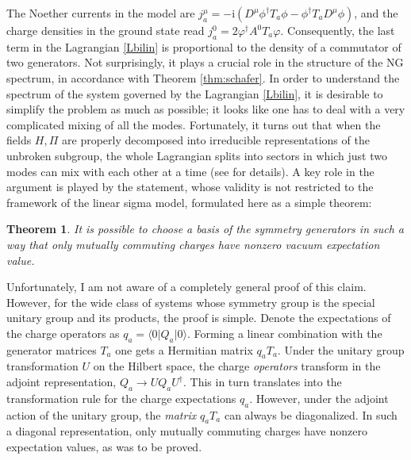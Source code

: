 \documentclass[final,3p,times,12pt,a4paper,sort&compress]{elsarticle}
\newcommand\bra[1]{\langle#1\vert}          %
\newcommand\ket[1]{\vert#1\rangle}          %
\newcommand\he[1]{#1^{\dagger}}             %
\newcommand\imag{\mathrm i}                 %
\newcommand\thname{Theorem}
\newtheorem{theorem}{\thname}
\newcommand\vp{\varphi}
\begin{document}
The Noether currents in the model are $j^\mu_a=-\imag(D^\mu\he\phi T_a\phi-
\he\phi T_aD^\mu\phi)$, and the charge densities in the ground state read
$j^0_a=2\he\vp A^0T_a\vp$. Consequently, the last term in the Lagrangian
\eqref{Lbilin} is proportional to the density of a commutator of two
generators. Not surprisingly, it plays a crucial role in the structure of
the NG spectrum, in accordance with Theorem \ref{thm:schafer}. In order to
understand the spectrum of the system governed by the Lagrangian \eqref{Lbilin},
it is desirable to simplify the problem as much as possible; it looks like one
has to deal with a very complicated mixing of all the modes. Fortunately, it
turns out that when the fields $H,\Pi$ are properly decomposed into irreducible
representations of the unbroken subgroup, the whole Lagrangian splits into
sectors in which just two modes can mix with each other at a time (see
\cite{Brauner:2005di} for details). A key role in the argument is played by the
statement, whose validity is not restricted to the framework of the
linear sigma model, formulated here as a simple theorem:
\begin{theorem}
It is possible to choose a basis of the symmetry generators in such a way that
only mutually commuting charges have nonzero vacuum expectation value.
\end{theorem}
Unfortunately, I am not aware of a completely general proof of this claim.
However, for the wide class of systems whose symmetry group is the special
unitary group and its products, the proof is simple. Denote the expectations of
the charge operators as $q_a=\bra0Q_a\ket0$. Forming a linear combination with
the generator matrices $T_a$ one gets a Hermitian matrix $q_aT_a$. Under the
unitary group transformation $U$ on the Hilbert space, the charge
\emph{operators} transform in the adjoint representation, $Q_a\to UQ_a\he U$.
This in turn translates into the transformation rule for the charge expectations
$q_a$. However, under the adjoint action of the unitary group, the \emph{matrix}
$q_aT_a$ can always be diagonalized. In such a diagonal representation, only
mutually commuting charges have nonzero expectation values, as was to be proved.
\end{document}
